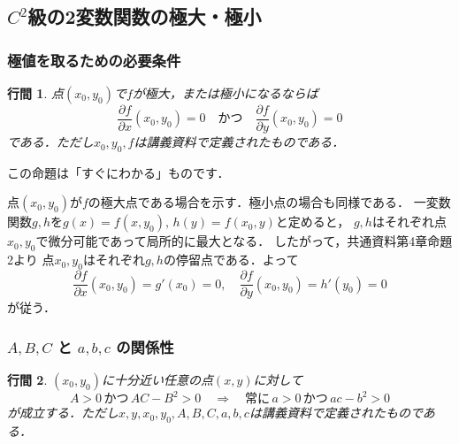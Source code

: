 \documentclass[uplatex]{jsarticle}
\makeatletter
\renewenvironment{proof}[1][\proofname]{\par
        \pushQED{\qed}
        \normalfont
        \topsep6\p@\@plus6\p@ \trivlist
        \item[\hskip\labelsep{\bfseries #1}\@addpunct{\bfseries}]\ignorespaces
    }{%
        \popQED\endtrivlist\@endpefalse
    }
\renewcommand{\proofname}{\underline{証明.}}
\newtheorem{proposition}{行間}
\makeatother
\begin{document}
\subsection{$C^2$級の2変数関数の極大・極小}

\subsubsection{極値を取るための必要条件}
\begin{screen}
    \begin{proposition}
        点$(x_0, y_0)$で$f$が極大，または極小になるならば
        \begin{equation}
            \frac{\partial f}{\partial x}(x_0, y_0) = 0
            \quad \mbox{かつ} \quad
            \frac{\partial f}{\partial y}(x_0, y_0) = 0
        \end{equation}
        である．ただし$x_0, y_0, f$は講義資料で定義されたものである．
    \end{proposition}
\end{screen}

この命題は「すぐにわかる」ものです．

\begin{proof}
    点$(x_0, y_0)$が$f$の極大点である場合を示す．極小点の場合も同様である．
    一変数関数$g, h$を$g(x) = f(x, y_0),\,h(y) = f(x_0, y)$と定めると，
    $g, h$はそれぞれ点$x_0, y_0$で微分可能であって局所的に最大となる．
    したがって，共通資料第4章命題2より
    点$x_0, y_0$はそれぞれ$g, h$の停留点である．よって
    \begin{equation}
        \frac{\partial f}{\partial x}(x_0, y_0) = g'(x_0) = 0
        ,\quad
        \frac{\partial f}{\partial y}(x_0, y_0) = h'(y_0) = 0
    \end{equation}
    が従う．
\end{proof}

\subsubsection{$A, B, C$ と $a, b, c$ の関係性}
\begin{screen}
    \begin{proposition}
        $(x_0, y_0)$に十分近い任意の点$(x, y)$に対して
        \begin{equation}
            A > 0
            \,\mbox{かつ}\,
            AC - B^2 > 0
            \quad \Longrightarrow \quad
            \mbox{常に}\,
            a > 0
            \,\mbox{かつ}\,
            ac - b^2 > 0
        \end{equation}
        が成立する．ただし$x, y, x_0, y_0, A, B, C, a, b, c$は講義資料で定義されたものである．
    \end{proposition}
\end{screen}
\end{document}
